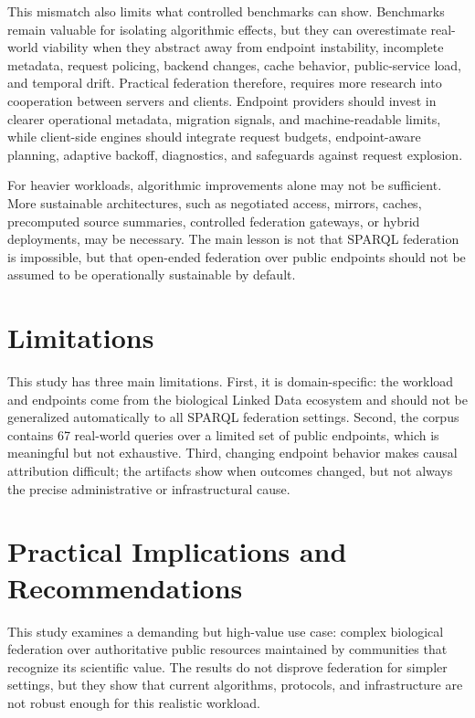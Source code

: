 \documentclass[runningheads]{llncs}
\begin{document}
This mismatch also limits what controlled benchmarks can show. 
Benchmarks remain valuable for isolating algorithmic effects, but they can overestimate real-world viability when they abstract away from endpoint instability, incomplete metadata, request policing, backend changes, cache behavior, public-service load, and temporal drift. 
Practical federation therefore, requires more research into cooperation between servers and clients. 
Endpoint providers should invest in clearer operational metadata, migration signals, and machine-readable limits, while client-side engines should integrate request budgets, endpoint-aware planning, adaptive backoff, diagnostics, and safeguards against request explosion.

For heavier workloads, algorithmic improvements alone may not be sufficient. 
More sustainable architectures, such as negotiated access, mirrors, caches, precomputed source summaries, controlled federation gateways, or hybrid deployments, may be necessary. 
The main lesson is not that SPARQL federation is impossible, but that open-ended federation over public endpoints should not be assumed to be operationally sustainable by default.

\section{Limitations}\label{sec7}
This study has three main limitations. 
First, it is domain-specific: the workload and endpoints come from the biological Linked Data ecosystem and should not be generalized automatically to all SPARQL federation settings. 
Second, the corpus contains 67 real-world queries over a limited set of public endpoints, which is meaningful but not exhaustive. 
Third, changing endpoint behavior makes causal attribution difficult; the artifacts show when outcomes changed, but not always the precise administrative or infrastructural cause.

\section{Practical Implications and Recommendations}\label{sec8}
This study examines a demanding but high-value use case: complex biological federation over authoritative public resources maintained by communities that recognize its scientific value. 
The results do not disprove federation for simpler settings, but they show that current algorithms, protocols, and infrastructure are not robust enough for this realistic workload.
\end{document}
